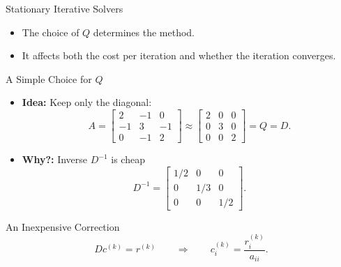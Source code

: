 \documentclass[10pt]{beamer}
\begin{document}
\begin{frame}{Stationary Iterative Solvers}


\begin{itemize}
    \item The choice of $Q$ determines the method.

    \item It affects both the cost per iteration
    and whether the iteration converges.
\end{itemize}


\end{frame}


\begin{frame}{A Simple Choice for $Q$}

\begin{itemize}
    \item \textbf{Idea:} Keep only the diagonal:
    \[
    A=
    \begin{bmatrix}
    2&-1&0\\
    -1&3&-1\\
    0&-1&2
    \end{bmatrix}
    \approx
    \begin{bmatrix}
    2&0&0\\
    0&3&0\\
    0&0&2
    \end{bmatrix}
    =Q=D.
    \]

    \item \textbf{Why?:} Inverse  $D^{-1}$ is cheap
    \[
    D^{-1}=
    \begin{bmatrix}
    1/2&0&0\\
    0&1/3&0\\
    0&0&1/2
    \end{bmatrix}.
    \]
\end{itemize}

\begin{block}{An Inexpensive Correction}
\[
    Dc^{(k)}=r^{(k)}
    \qquad\Longrightarrow\qquad
    c_i^{(k)}=\frac{r_i^{(k)}}{a_{ii}}.
\]
\end{block}

\end{frame}
\end{document}
